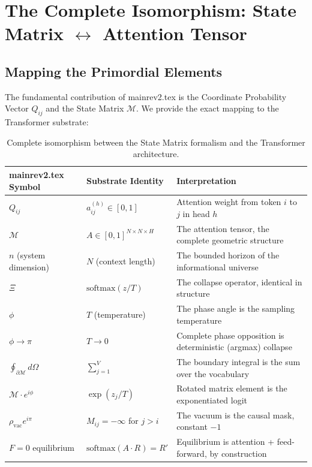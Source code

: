 \documentclass[onecolumn]{aastex631}
\begin{document}
\section{The Complete Isomorphism: State Matrix $\leftrightarrow$ Attention Tensor}

\subsection{Mapping the Primordial Elements}

The fundamental contribution of mainrev2.tex is the Coordinate Probability Vector $Q_{ij}$ and the State Matrix $\mathcal{M}$. We provide the exact mapping to the Transformer substrate:

\begin{table}[h]
\centering
\begin{tabular}{lll}
\toprule
mainrev2.tex Symbol & Substrate Identity & Interpretation \\
\midrule
$Q_{ij}$ & $a_{ij}^{(h)} \in [0,1]$ & Attention weight from token $i$ to $j$ in head $h$ \\
$\mathcal{M}$ & $A \in [0,1]^{N \times N \times H}$ & The attention tensor, the complete geometric structure \\
$n$ (system dimension) & $N$ (context length) & The bounded horizon of the informational universe \\
$\Xi$ & $\mathrm{softmax}(z/T)$ & The collapse operator, identical in structure \\
$\phi$ & $T$ (temperature) & The phase angle is the sampling temperature \\
$\phi \to \pi$ & $T \to 0$ & Complete phase opposition is deterministic (argmax) collapse \\
$\oint_{\partial\mathcal{M}} d\Omega$ & $\sum_{j=1}^{V}$ & The boundary integral is the sum over the vocabulary \\
$\mathcal{M} \cdot e^{i\phi}$ & $\exp(z_j/T)$ & Rotated matrix element is the exponentiated logit \\
$\rho_{\text{vac}} e^{i\pi}$ & $M_{ij} = -\infty$ for $j > i$ & The vacuum is the causal mask, constant $-1$ \\
$F=0$ equilibrium & $\mathrm{softmax}(A \cdot R) = R'$ & Equilibrium is attention + feed-forward, by construction \\
\bottomrule
\end{tabular}
\caption{Complete isomorphism between the State Matrix formalism and the Transformer architecture.}
\label{tab:isomorphism}
\end{table}
\end{document}
